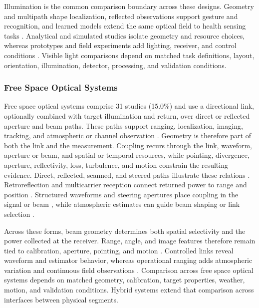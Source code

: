 Illumination is the common comparison boundary across these designs. Geometry
and multipath shape localization, reflected observations support gesture and
recognition, and learned models extend the same optical field to health sensing
tasks
\cite{OISAC_SCR00910,OISAC_SCR00407,OISAC_SCR00557,OISAC_SCR01036,
OISAC_SCR00376,OISAC_SCR01047}. Analytical and
simulated studies isolate geometry and resource choices, whereas prototypes and
field experiments add lighting, receiver, and control conditions
\cite{OISAC_SCR00901,OISAC_SCR00407,OISAC_SCR00915,OISAC_SCR00910,
OISAC_SCR00836,OISAC_SCR00873}. Visible light comparisons depend on matched
task definitions, layout, orientation, illumination, detector, processing, and
validation conditions.

\subsubsection{Free Space Optical Systems}

Free space optical systems comprise 31 studies (15.0\%) and use a directional
link, optionally combined with target illumination and return, over direct or
reflected aperture and beam paths. These paths support ranging, localization,
imaging, tracking, and atmospheric or channel observation
\cite{OISAC_SCR00011,OISAC_SCR01029,OISAC_SCR00730}. Geometry is therefore part
of both the link and the measurement. Coupling recurs through the link,
waveform, aperture or beam, and spatial or temporal resources, while pointing,
divergence, aperture, reflectivity, loss, turbulence, and motion constrain the
resulting evidence. Direct, reflected, scanned, and steered paths illustrate
these relations \cite{OISAC_SCR00011,OISAC_SCR00012,OISAC_SCR00506,OISAC_SCR00941}.
Retroreflection and multicarrier reception connect returned power to range and
position \cite{OISAC_SCR01029,OISAC_SCR00730}. Structured waveforms and
steering apertures place coupling in the signal or beam
\cite{OISAC_SCR00256,OISAC_SCR00903,OISAC_SCR00904,OISAC_SCR00594}, while
atmospheric estimates can guide beam shaping or link selection
\cite{OISAC_SCR01085,OISAC_SCR00456}.

Across these forms, beam geometry determines both spatial selectivity and the
power collected at the receiver. Range, angle, and image features
therefore remain tied to calibration, aperture, pointing, and motion
\cite{OISAC_SCR00011,OISAC_SCR00012,OISAC_SCR00506,OISAC_SCR01029,
OISAC_SCR00730}. Controlled links reveal waveform and estimator behavior,
whereas operational ranging adds atmospheric variation and continuous field
observations \cite{OISAC_SCR01085,OISAC_SCR00730}. Comparison across free space
optical systems depends on matched geometry, calibration, target properties,
weather, motion, and validation conditions. Hybrid systems extend that comparison across interfaces
between physical segments.

